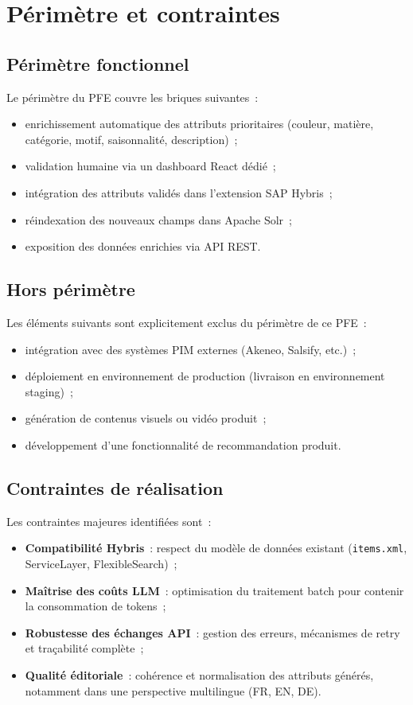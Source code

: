 \section{Périmètre et contraintes}

\subsection{Périmètre fonctionnel}
Le périmètre du PFE couvre les briques suivantes~:
\begin{itemize}
  \item enrichissement automatique des attributs prioritaires (couleur, matière, catégorie, motif, saisonnalité, description)~;
  \item validation humaine via un dashboard React dédié~;
  \item intégration des attributs validés dans l'extension SAP Hybris~;
  \item réindexation des nouveaux champs dans Apache Solr~;
  \item exposition des données enrichies via API REST.
\end{itemize}

\subsection{Hors périmètre}
Les éléments suivants sont explicitement exclus du périmètre de ce PFE~:
\begin{itemize}
  \item intégration avec des systèmes PIM externes (Akeneo, Salsify, etc.)~;
  \item déploiement en environnement de production (livraison en environnement staging)~;
  \item génération de contenus visuels ou vidéo produit~;
  \item développement d'une fonctionnalité de recommandation produit.
\end{itemize}

\subsection{Contraintes de réalisation}
Les contraintes majeures identifiées sont~:
\begin{itemize}
  \item \textbf{Compatibilité Hybris}~: respect du modèle de données existant (\texttt{items.xml}, ServiceLayer, FlexibleSearch)~;
  \item \textbf{Maîtrise des coûts LLM}~: optimisation du traitement batch pour contenir la consommation de tokens~;
  \item \textbf{Robustesse des échanges API}~: gestion des erreurs, mécanismes de retry et traçabilité complète~;
  \item \textbf{Qualité éditoriale}~: cohérence et normalisation des attributs générés, notamment dans une perspective multilingue (FR, EN, DE).
\end{itemize}

